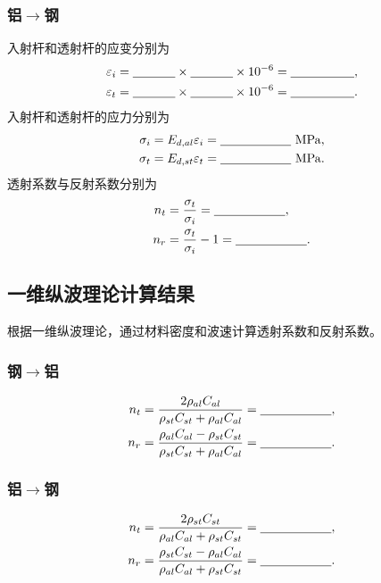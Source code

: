 \documentclass[UTF8,a4paper,12pt]{ctexart}
\newcommand{\blank}[1][2.5cm]{\mbox{\underline{\hspace{#1}}}}
\numberwithin{equation}{section}
\begin{document}
\subsubsection{铝\texorpdfstring{$\rightarrow$}{→}钢}
入射杆和透射杆的应变分别为
\begin{subequations}
\begin{align}
  \varepsilon_i&=\blank[1.2cm]\times\blank[1.2cm]\times10^{-6}=\blank[1.8cm],\\
  \varepsilon_t&=\blank[1.2cm]\times\blank[1.2cm]\times10^{-6}=\blank[1.8cm].
\end{align}
\end{subequations}
入射杆和透射杆的应力分别为
\begin{subequations}
\begin{align}
  \sigma_i&=E_{d,al}\varepsilon_i=\blank[2cm]\ \mathrm{MPa},\\
  \sigma_t&=E_{d,st}\varepsilon_t=\blank[2cm]\ \mathrm{MPa}.
\end{align}
\end{subequations}
透射系数与反射系数分别为
\begin{subequations}
\begin{align}
  n_t&=\frac{\sigma_t}{\sigma_i}=\blank[2cm],\\
  n_r&=\frac{\sigma_t}{\sigma_i}-1=\blank[2cm].
\end{align}
\end{subequations}

\subsection{一维纵波理论计算结果}
根据一维纵波理论，通过材料密度和波速计算透射系数和反射系数。

\subsubsection{钢\texorpdfstring{$\rightarrow$}{→}铝}
\begin{subequations}
\begin{align}
  n_t&=\frac{2\rho_{al}C_{al}}{\rho_{st}C_{st}+\rho_{al}C_{al}}=\blank[2cm],\\
  n_r&=\frac{\rho_{al}C_{al}-\rho_{st}C_{st}}{\rho_{st}C_{st}+\rho_{al}C_{al}}=\blank[2cm].
\end{align}
\end{subequations}

\subsubsection{铝\texorpdfstring{$\rightarrow$}{→}钢}
\begin{subequations}
\begin{align}
  n_t&=\frac{2\rho_{st}C_{st}}{\rho_{al}C_{al}+\rho_{st}C_{st}}=\blank[2cm],\\
  n_r&=\frac{\rho_{st}C_{st}-\rho_{al}C_{al}}{\rho_{al}C_{al}+\rho_{st}C_{st}}=\blank[2cm].
\end{align}
\end{subequations}
\end{document}
